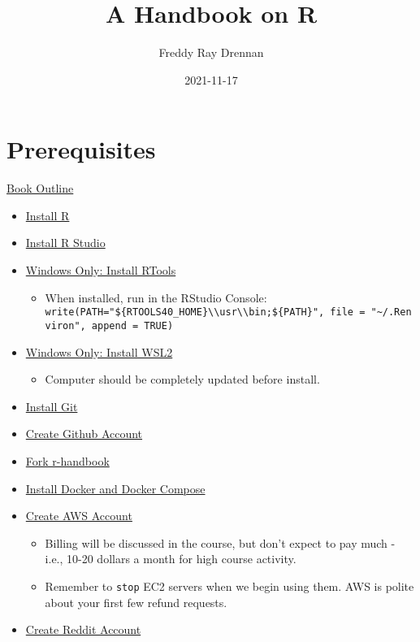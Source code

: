 \documentclass[
]{book}
\title{A Handbook on R}
\author{Freddy Ray Drennan}
\date{2021-11-17}
\providecommand{\tightlist}{%
  \setlength{\itemsep}{0pt}\setlength{\parskip}{0pt}}
\begin{document}
\maketitle

{
\setcounter{tocdepth}{1}
\tableofcontents
}
\hypertarget{prerequisites}{%
\chapter{Prerequisites}\label{prerequisites}}

\href{https://hackmd.io/vGRGEPo8QQyiG8gecWv71g}{Book Outline}

\begin{itemize}
\tightlist
\item
  \href{https://cran.r-project.org/}{Install R}
\item
  \href{https://www.rstudio.com/products/rstudio/download/}{Install R Studio}
\item
  \href{https://cran.r-project.org/bin/windows/Rtools/}{Windows Only: Install RTools}

  \begin{itemize}
  \tightlist
  \item
    When installed, run in the RStudio Console: \texttt{write(\textquotesingle{}PATH="\$\{RTOOLS40\_HOME\}\textbackslash{}\textbackslash{}usr\textbackslash{}\textbackslash{}bin;\$\{PATH\}"\textquotesingle{},\ file\ =\ "\textasciitilde{}/.Renviron",\ append\ =\ TRUE)}
  \end{itemize}
\item
  \href{https://www.omgubuntu.co.uk/how-to-install-wsl2-on-windows-10}{Windows Only: Install WSL2}

  \begin{itemize}
  \tightlist
  \item
    Computer should be completely updated before install.
  \end{itemize}
\item
  \href{https://git-scm.com/downloads}{Install Git}
\item
  \href{https://github.com/}{Create Github Account}
\item
  \href{https://github.com/fdrennan/r-handbook}{Fork r-handbook}
\item
  \href{https://docs.docker.com/get-docker/}{Install Docker and Docker Compose}
\item
  \href{https://aws.amazon.com/}{Create AWS Account}

  \begin{itemize}
  \tightlist
  \item
    Billing will be discussed in the course, but don't expect to pay much - i.e., 10-20 dollars a month for high course activity.
  \item
    Remember to \texttt{stop} EC2 servers when we begin using them. AWS is polite about your first few refund requests.
  \end{itemize}
\item
  \href{reddit.com}{Create Reddit Account}


\end{itemize}
\end{document}
